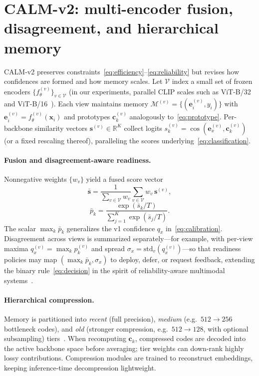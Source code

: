 \documentclass[12pt,a4paper]{report}
\begin{document}
\section{CALM-v2: multi-encoder fusion, disagreement, and hierarchical memory}
CALM-v2 preserves constraints~\eqref{eq:efficiency}--\eqref{eq:reliability} but revises how confidences are formed and how memory scales. Let $\mathcal{V}$ index a small set of frozen encoders $\{f_\theta^{(v)}\}_{v\in\mathcal{V}}$ (in our experiments, parallel CLIP scales such as ViT-B/32 and ViT-B/16~\cite{r1}). Each view maintains memory $\mathcal{M}^{(v)}=\{(\mathbf{e}^{(v)}_i,y_i)\}$ with $\mathbf{e}^{(v)}_i=f_\theta^{(v)}(\mathbf{x}_i)$ and prototypes $\mathbf{c}^{(v)}_k$ analogously to~\eqref{eq:prototype}. Per-backbone similarity vectors $\mathbf{s}^{(v)}\in\mathbb{R}^K$ collect logits $s^{(v)}_k = \cos(\mathbf{e}^{(v)}_x,\mathbf{c}^{(v)}_k)$ (or a fixed rescaling thereof), paralleling the scores underlying~\eqref{eq:classification}.

\paragraph{Fusion and disagreement-aware readiness.}
Nonnegative weights $\{w_v\}$ yield a fused score vector
\begin{equation}
  \bar{\mathbf{s}} = \frac{1}{\sum_{v\in\mathcal{V}} w_v} \sum_{v\in\mathcal{V}} w_v\, \mathbf{s}^{(v)},
\end{equation}
\begin{equation}
  \bar{p}_k = \frac{\exp(\bar{s}_k / T)}{\sum_{j=1}^{K} \exp(\bar{s}_j / T)}.
\end{equation}
The scalar $\max_k \bar{p}_k$ generalizes the v1 confidence $q_x$ in~\eqref{eq:calibration}. Disagreement across views is summarized separately---for example, with per-view maxima $q_x^{(v)} = \max_k p_k^{(v)}$ and spread $\sigma_x = \mathrm{std}_v(q_x^{(v)})$---so that readiness policies may map $(\max_k\bar{p}_k, \sigma_x)$ to deploy, defer, or request feedback, extending the binary rule~\eqref{eq:decision} in the spirit of reliability-aware multimodal systems~\cite{r10,r21}.

\paragraph{Hierarchical compression.}
Memory is partitioned into \emph{recent} (full precision), \emph{medium} (e.g.\ $512\!\to\!256$ bottleneck codes), and \emph{old} (stronger compression, e.g.\ $512\!\to\!128$, with optional subsampling) tiers~\cite{r31,r32}. When recomputing $\mathbf{c}_k$, compressed codes are decoded into the active backbone space before averaging; tier weights can down-rank highly lossy contributions. Compression modules are trained to reconstruct embeddings, keeping inference-time decompression lightweight.
\end{document}
